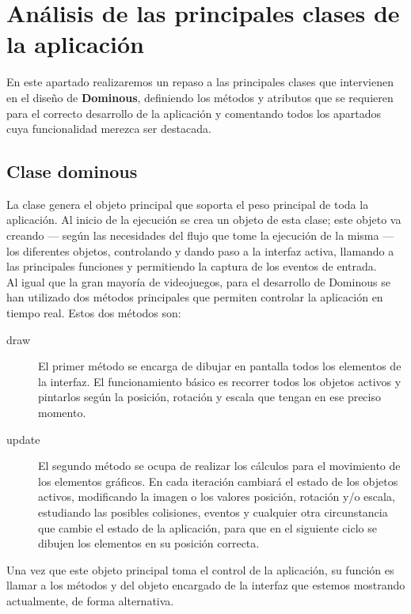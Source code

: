 \section{Análisis de las principales clases de la aplicación}

En este apartado realizaremos un repaso a las principales clases que intervienen en el diseño de \textbf{Dominous},
definiendo los métodos y atributos que se requieren para el correcto desarrollo de la aplicación y comentando
todos los apartados cuya funcionalidad merezca ser destacada.

\subsection{Clase dominous}

La clase  genera el objeto principal que soporta el peso principal de toda la aplicación. Al inicio de la
ejecución se crea un objeto de esta clase; este objeto va creando --- según las necesidades del flujo que tome
la ejecución de la misma --- los diferentes objetos, controlando y dando paso a la interfaz activa, llamando a
las principales funciones y permitiendo la captura de los eventos de entrada. \\

Al igual que la gran mayoría de videojuegos, para el desarrollo de Dominous se han utilizado dos métodos principales
que permiten controlar la aplicación en tiempo real. Estos dos métodos son:
\begin{description}
    \item[draw] El primer método se encarga de dibujar en pantalla todos los elementos de la interfaz. El funcionamiento
        básico es recorrer todos los objetos activos y pintarlos según la posición, rotación y escala que tengan en
        ese preciso momento. 
    \item[update] El segundo método se ocupa de realizar los cálculos para el movimiento de los elementos gráficos. 
        En cada iteración cambiará el estado de los objetos activos, modificando la imagen o los valores posición,
        rotación y/o escala, estudiando las posibles colisiones, eventos y cualquier otra circunstancia que cambie
        el estado de la aplicación, para que en el siguiente ciclo se dibujen los elementos en su posición correcta.
\end{description}

Una vez que este objeto principal toma el control de la aplicación, su función es llamar a los métodos 
y  del objeto encargado de la interfaz que estemos mostrando actualmente, de forma alternativa. \\

